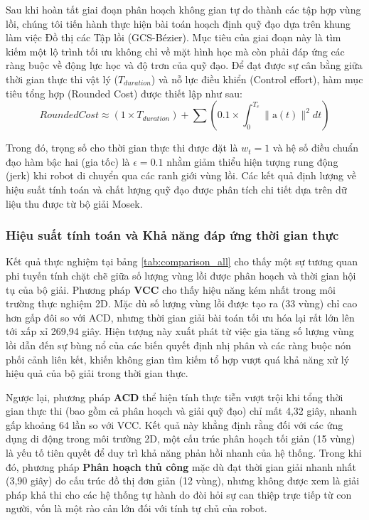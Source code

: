 Sau khi hoàn tất giai đoạn phân hoạch không gian tự do thành các tập hợp vùng lồi, chúng tôi tiến hành thực hiện bài toán hoạch định quỹ đạo dựa trên khung làm việc Đồ thị các Tập lồi (GCS-Bézier). Mục tiêu của giai đoạn này là tìm kiếm một lộ trình tối ưu không chỉ về mặt hình học mà còn phải đáp ứng các ràng buộc về động lực học và độ trơn của quỹ đạo. Để đạt được sự cân bằng giữa thời gian thực thi vật lý ($T_{duration}$) và nỗ lực điều khiển (Control effort), hàm mục tiêu tổng hợp (Rounded Cost) được thiết lập như sau:
$$Rounded Cost \approx (1 \times T_{duration}) + \sum \left( 0.1 \times \int_{0}^{T_e} \|\text{a}(t)\|^2 dt \right)$$

Trong đó, trọng số cho thời gian thực thi được đặt là $w_{t}=1$ và hệ số điều chuẩn đạo hàm bậc hai (gia tốc) là $\epsilon = 0.1$ nhằm giảm thiểu hiện tượng rung động (jerk) khi robot di chuyển qua các ranh giới vùng lồi. Các kết quả định lượng về hiệu suất tính toán và chất lượng quỹ đạo được phân tích chi tiết dựa trên dữ liệu thu được từ bộ giải Mosek.

\subsubsection*{Hiệu suất tính toán và Khả năng đáp ứng thời gian thực}

Kết quả thực nghiệm tại bảng \ref{tab:comparison_all} cho thấy một sự tương quan phi tuyến tính chặt chẽ giữa số lượng vùng lồi được phân hoạch và thời gian hội tụ của bộ giải. Phương pháp \textbf{VCC} cho thấy hiệu năng kém nhất trong môi trường thực nghiệm 2D. Mặc dù số lượng vùng lồi được tạo ra (33 vùng) chỉ cao hơn gấp đôi so với ACD, nhưng thời gian giải bài toán tối ưu hóa lại rất lớn lên tới xấp xỉ 269,94 giây. Hiện tượng này xuất phát từ việc gia tăng số lượng vùng lồi dẫn đến sự bùng nổ của các biến quyết định nhị phân  và các ràng buộc nón phối cảnh liên kết, khiến không gian tìm kiếm tổ hợp vượt quá khả năng xử lý hiệu quả của bộ giải trong thời gian thực.

Ngược lại, phương pháp \textbf{ACD} thể hiện tính thực tiễn vượt trội khi tổng thời gian thực thi (bao gồm cả phân hoạch và giải quỹ đạo) chỉ mất 4,32 giây, nhanh gấp khoảng 64 lần so với VCC. Kết quả này khẳng định rằng đối với các ứng dụng di động trong môi trường 2D, một cấu trúc phân hoạch tối giản (15 vùng) là yếu tố tiên quyết để duy trì khả năng phản hồi nhanh của hệ thống. Trong khi đó, phương pháp \textbf{Phân hoạch thủ công} mặc dù đạt thời gian giải nhanh nhất (3,90 giây) do cấu trúc đồ thị đơn giản (12 vùng), nhưng không được xem là giải pháp khả thi cho các hệ thống tự hành do đòi hỏi sự can thiệp trực tiếp từ con người, vốn là một rào cản lớn đối với tính tự chủ của robot.

